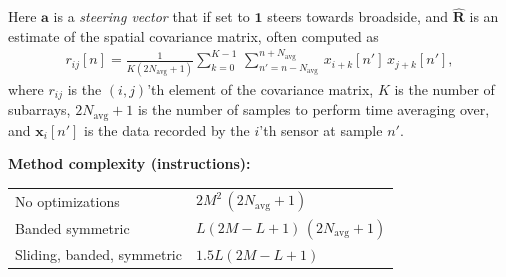 \documentclass[12pt,journal,captionsoff,onecolumn]{IEEEtran}
\newcommand\argmin{\text{argmin}}
\newcommand\sumb[2]{\sum\limits_{#1}^{#2}\,}
\renewcommand\H{^{\scriptscriptstyle H}}
\renewcommand\vec[1]{\boldsymbol{#1}}
\newcommand\mat[1]{\boldsymbol{#1}}
\newcommand\1{\vec 1}
\renewcommand*\a{\vec a}
\newcommand*\w{\vec w}
\newcommand*\x{\vec x}
\newcommand*\R{\mat R}
\newcommand*\eR{\mat{\hat R}}
\newcommand*\Navg{N_\text{avg}}
\begin{document}
% 
% 


\newpage
Here $\vec a$ is a \emph{steering vector} that if set to $\vec 1$ steers towards broadside, and $\hat{\mat R}$ is an estimate of the spatial covariance matrix, often computed as
\begin{gather*}
r_{ij}[n] = \frac{1}{K(2N_{\text{avg}}+1)}\sumb{k=0}{K-1} \sumb{n'=n-N_{\text{avg}}}{n+N_{\text{avg}}} x_{i+k}[n']\,x_{j+k}[n'],
\end{gather*}
where $r_{ij}$ is the $(i,j)$'th element of the covariance matrix, $K$ is the number of subarrays, $2N_{\text{avg}}+1$ is the number of samples to perform time averaging over, and $\vec x_i[n']$ is the data recorded by the $i$'th sensor at sample $n'$. 



{\bf Method complexity (instructions):}\\
\begin{tabular}{l l}
No optimizations            & $2M^2\,(2\Navg+1)$ \\
Banded symmetric            & $L(2M-L+1)\,(2\Navg+1)$ \\
Sliding, banded, symmetric  & $1.5L(2M-L+1)$ \\
\end{tabular}\\\\
\end{document}
